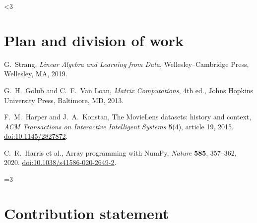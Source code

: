 \documentclass[11pt,a4paper]{article}
\newcommand{\stage}{3}
\newif\ifshowguide
\theoremstyle{plain}
\theoremstyle{definition}
\theoremstyle{remark}
\newcommand{\guide}[1]{\ifshowguide\par\smallskip\noindent
  \colorbox{gray!12}{\parbox{\dimexpr\linewidth-2\fboxsep}{\small\itshape
  \textbf{Guidance.} #1}}\par\smallskip\fi}
\newcommand{\bodyend}{\label{body-end}}
\begin{document}
\ifnum\stage<3
\section{Plan and division of work}
\label{sec:plan}

\guide{Interim reports only; this section disappears from the final
report. \emph{Interim report 1}: the planned steps and who does what.
\emph{Interim report 2}: what is not working yet, any change of plan,
and the outline of the final report.}
\fi

\bodyend

\begin{thebibliography}{9}

G.~Strang,
\emph{Linear Algebra and Learning from Data},
Wellesley--Cambridge Press, Wellesley, MA, 2019.

G.~H.~Golub and C.~F.~Van Loan,
\emph{Matrix Computations}, 4th ed.,
Johns Hopkins University Press, Baltimore, MD, 2013.

F.~M.~Harper and J.~A.~Konstan,
The MovieLens datasets: history and context,
\emph{ACM Transactions on Interactive Intelligent Systems} \textbf{5}(4),
article 19, 2015.
\href{https://doi.org/10.1145/2827872}{doi:10.1145/2827872}.

C.~R.~Harris et al.,
Array programming with NumPy,
\emph{Nature} \textbf{585}, 357--362, 2020.
\href{https://doi.org/10.1038/s41586-020-2649-2}{doi:10.1038/s41586-020-2649-2}.

\end{thebibliography}

\ifnum\stage=3
\appendix

\section{Contribution statement}

\guide{Required. Who did what, agreed by all members. Staff may adjust
an individual grade if contributions are clearly unequal.}
\end{document}
